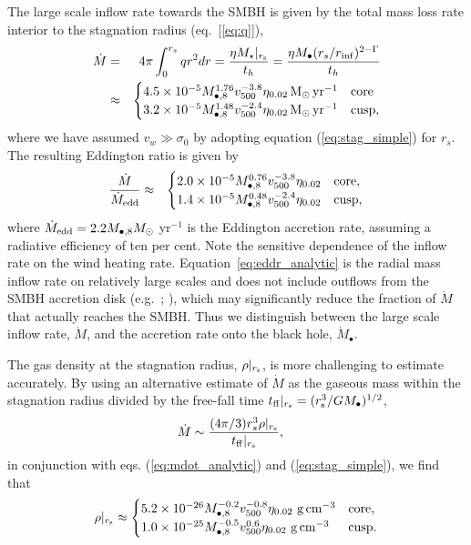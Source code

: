 \documentclass[usenatbib,fleqn]{mn2e}
\newcommand{\rs}{r_s}
\newcommand{\Mbh}[1][]{M_{\bullet#1}}
\newcommand{\Mbheight}{M_{\bullet,8}}
\newcommand{\rinf}{r_{\rm inf}}
\newcommand{\pyear}{{\rm yr}^{-1}}
\renewcommand{\th}{t_h}
\newcommand{\tff}{t_{\rm ff}}
\begin{document}
The large scale inflow rate towards the SMBH is given by the total
mass loss rate interior to the stagnation radius (eq.~[\ref{eq:q}]),
\begin{eqnarray}
  \dot{M} &=& 4\pi \int_{0}^{r_{s}}q r^{2}dr = \frac{\eta
    M_{\star}|_{r_{\rm s}}}{\th} = \frac{\eta \Mbh (\rs/\rinf)^{2-\Gamma}}{\th} \nonumber \\
  &\approx&
  \begin{cases}
    4.5 \times 10^{-5} M_{\bullet,8}^{1.76}
    v_{500}^{-3.8}  \eta_{0.02} \Msun \, \pyear& \text{core} \\
    3.2 \times 10^{-5} M_{\bullet,8}^{1.48} 
    v_{500}^{-2.4}  \eta_{0.02} \Msun \, \pyear  & \text{cusp}, 
  \end{cases}
  \label{eq:mdot_analytic}            
\end{eqnarray}
where we have assumed $v_{w} \gg \sigma_0$ by adopting equation
(\ref{eq:stag_simple}) for $r_s$.  The resulting Eddington ratio is
given by
\begin{eqnarray}
\frac{\dot{M}}{\dot{M}_{\rm edd}} &\approx&
  \begin{cases}
    2.0 \times 10^{-5} M_{\bullet,8}^{0.76}
    v_{500}^{-3.8}  \eta_{0.02}   & \text{core}, \\
    1.4 \times 10^{-5} \Mbheight^{0.48} 
    v_{500}^{-2.4}  \eta_{0.02}   & \text{cusp}, 
  \end{cases}
  \label{eq:eddr_analytic}
\end{eqnarray}
where $\dot{M}_{\rm edd} = 2.2M_{\bullet,8}M_{\odot}$ yr$^{-1}$ is the
Eddington accretion rate, assuming a radiative efficiency of ten per
cent.  Note the sensitive dependence of the inflow rate on the wind
heating rate.  Equation~\eqref{eq:eddr_analytic} is the radial mass
inflow rate on relatively large scales and does not include outflows
from the SMBH accretion disk (e.g.~\citealt{Blandford&Begelman99};
\citealt{Li+13}), which may significantly reduce the fraction of
$\dot{M}$ that actually reaches the SMBH. Thus we distinguish between
the large scale inflow rate, $\dot{M}$, and the accretion rate onto
the black hole, $\dot{M}_{\bullet}$.

The gas density at the stagnation radius, $\rho|_{r_{\rm s}}$, is more
challenging to estimate accurately.  By using an alternative estimate of
$\dot{M}$ as the gaseous mass within the stagnation radius divided by
the free-fall time $t_{\rm ff}|_{r_{\rm s}} = (r_{\rm
  s}^{3}/GM_{\bullet})^{1/2}$,
\begin{align}
  &\dot{M}\sim\frac{(4 \pi/3) \rs^3 \rho|_{r_{\rm s}}}{\tff|_{r_{\rm s}}},
  \label{eq:mdot_gas}
\end{align}
 in conjunction with eqs. (\ref{eq:mdot_analytic}) and (\ref{eq:stag_simple}), we find that
\begin{align}
  \rho|_{r_{\rm s}}\approx
  \begin{cases}
    5.2 \times 10^{-26} \Mbheight^{-0.2} v_{500}^{-0.8}  \eta_{0.02} \,
    \, {\rm g \, cm^{-3}}& \text{core},\\
    1.0 \times 10^{-25}  \Mbheight^{-0.5} v_{500}^{0.6}  \eta_{0.02} \,\, {\rm g \,cm^{-3}} & \text{cusp}.
  \end{cases}
  \label{eq:rhors}
\end{align}
\end{document}
